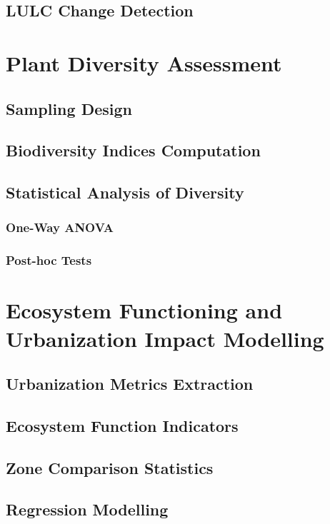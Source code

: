 \subsection{LULC Change Detection}
\label{subsection:2-4-4}
\section{Plant Diversity Assessment}
\label{section:2-5}
\subsection{Sampling Design}
\label{subsection:2-5-1}
\subsection{Biodiversity Indices Computation}
\label{subsection:2-5-2}
\subsection{Statistical Analysis of Diversity}
\label{subsection:2-5-3}
\subsubsection{One-Way ANOVA}
\label{subsubsection:2-5-3-1}
\subsubsection{Post-hoc Tests}
\label{subsubsection:2-5-3-2}
\section{Ecosystem Functioning and Urbanization Impact Modelling}
\label{section:2-6}
\subsection{Urbanization Metrics Extraction}
\label{subsection:2-6-1}
\subsection{Ecosystem Function Indicators}
\label{subsection:2-6-2}
\subsection{Zone Comparison Statistics}
\label{subsection:2-6-3}
\subsection{Regression Modelling}
\label{subsection:2-6-4}
